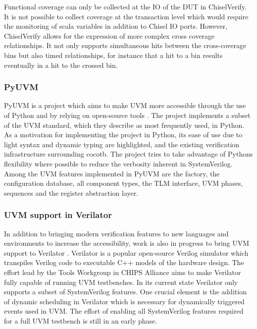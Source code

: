 \documentclass[11pt,a4paper]{report}
\begin{document}
Functional coverage can only be collected at the IO of the DUT in ChiselVerify. It is not possible to collect
coverage at the transaction level which would require the monitoring of scala variables in addition to Chisel IO
ports. However, ChiselVerify allows for the expression of more complex cross coverage relationships. It not only
supports simultaneous hits between the cross-coverage bins but also timed relationships, for instance that a hit to a
bin results eventually in a hit to the crossed bin.

\subsubsection{PyUVM} %

PyUVM is a project which aims to make UVM more accessible through the use of Python and by relying on open-source
tools \cite{pyuvm}. The project implements a subset of the UVM standard, which they describe as most frequently used,
in Python. As a motivation for implementing the project in Python, its ease of use due to light syntax and dynamic
typing are highlighted, and the existing verification infrastructure surrounding cocotb. The project tries to take
advantage of Pythons flexibility where possible to reduce the verbosity inherent in SystemVerilog. Among the UVM
features implemented in PyUVM are the factory, the configuration database, all component types, the TLM interface,
UVM phases, sequences and the register abstraction layer.

\subsubsection{UVM support in Verilator} %

In addition to bringing modern verification features to new languages and environments to increase the accessibility,
work is also in progress to bring UVM support to Verilator \cite{uvm_verilator}. Verilator is a popular open-source
Verilog simulator which transpiles Verilog code to executable C++ models of the hardware design. The effort lead by
the Tools Workgroup in CHIPS Alliance aims to make Verilator fully capable of running UVM testbenches. In its current
state Verilator only supports a subset of SystemVerilog features. One crucial element is the addition of dynamic
scheduling in Verilator which is necessary for dynamically triggered events used in UVM. The effort of enabling all
SystemVerilog features required for a full UVM testbench is still in an early phase.
\end{document}
